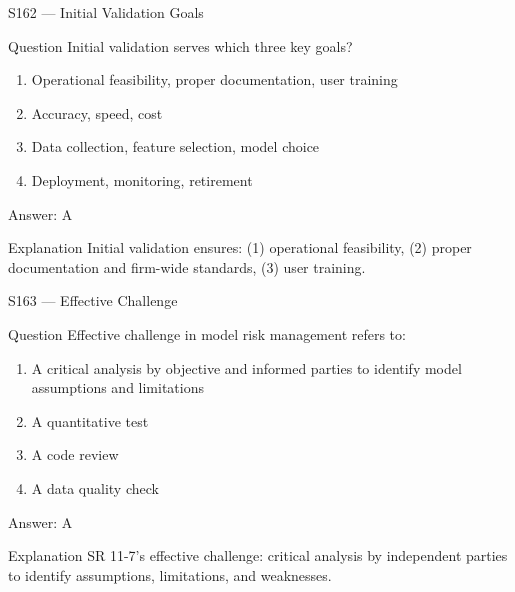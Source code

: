 \documentclass[aspectratio=169,8pt]{beamer}
\begin{document}
	\begin{frame}{S162 --- Initial Validation Goals}
		\begin{block}{Question}
			Initial validation serves which three key goals?
			\begin{enumerate}
				\item Operational feasibility, proper documentation, user training
				\item Accuracy, speed, cost
				\item Data collection, feature selection, model choice
				\item Deployment, monitoring, retirement
			\end{enumerate}
		\end{block}
		\begin{exampleblock}{Answer: A}\end{exampleblock}
		\begin{block}{Explanation}
			Initial validation ensures: (1) operational feasibility, (2) proper documentation and firm-wide standards, (3) user training.
		\end{block}
	\end{frame}
	
	\begin{frame}{S163 --- Effective Challenge}
		\begin{block}{Question}
			Effective challenge in model risk management refers to:
			\begin{enumerate}
				\item A critical analysis by objective and informed parties to identify model assumptions and limitations
				\item A quantitative test
				\item A code review
				\item A data quality check
			\end{enumerate}
		\end{block}
		\begin{exampleblock}{Answer: A}\end{exampleblock}
		\begin{block}{Explanation}
			SR 11-7's effective challenge: critical analysis by independent parties to identify assumptions, limitations, and weaknesses.
		\end{block}
	\end{frame}
	
\end{document}
